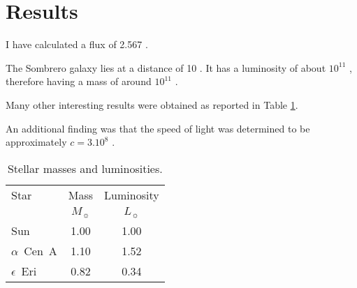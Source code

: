 \section{Results}
\label{sec:results}

I have calculated a flux of 2.567 \fluxdensity.

The Sombrero galaxy lies at a distance of 10 \Mpc. It has a luminosity of about $10^{11}$ \Lsun, therefore having a mass of around $10^{11}$ \Msun.

Many other interesting results were obtained as reported in Table \ref{tab:resultstable}.

An additional finding was that the speed of light was determined to be approximately $c=3.10^8$ \ms.


\begin{table}
 \centering
 \caption{Stellar masses and luminosities.}
  \label{tab:resultstable}
 \begin{tabular}{lcc}
  \hline
  Star & Mass & Luminosity\\
   & $M_{\sun}$ & $L_{\sun}$\\
  \hline
  Sun & 1.00 & 1.00\\
  $\alpha$~Cen~A & 1.10 & 1.52\\
  $\epsilon$~Eri & 0.82 & 0.34\\
  \hline
 \end{tabular}
\end{table}

